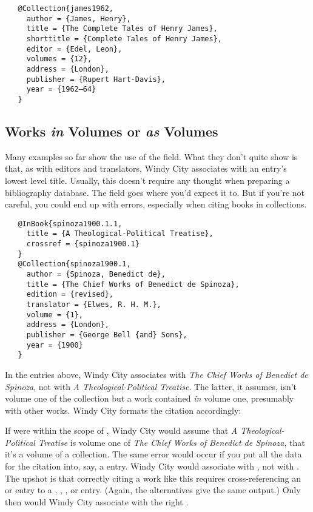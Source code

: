 \documentclass[11pt,letterpaper,oneside]{article}
\begin{document}
\begin{verbatim}
   @Collection{james1962,
     author = {James, Henry},
     title = {The Complete Tales of Henry James},
     shorttitle = {Complete Tales of Henry James},
     editor = {Edel, Leon},
     volumes = {12},
     address = {London},
     publisher = {Rupert Hart-Davis},
     year = {1962–64}
   }
\end{verbatim}

\subsection{Works \textit{in} Volumes or \textit{as} Volumes}

Many examples so far show the use of the  field. What
they don't quite show is that, as with editors and translators, Windy
City associates  with an entry's lowest level title.
Usually, this doesn't require any thought when preparing a
bibliography database. The  field goes where you'd
expect it to. But if you're not careful, you could end up with errors,
especially when citing books in collections.

\begin{verbatim}
   @InBook{spinoza1900.1.1,
     title = {A Theological-Political Treatise},
     crossref = {spinoza1900.1}
   }
   @Collection{spinoza1900.1,
     author = {Spinoza, Benedict de},
     title = {The Chief Works of Benedict de Spinoza},
     edition = {revised},
     translator = {Elwes, R. H. M.},
     volume = {1},
     address = {London},
     publisher = {George Bell {and} Sons},
     year = {1900}
   }
\end{verbatim}

In the entries above, Windy City associates  with
\textit{The Chief Works of Benedict de Spinoza}, not with \textit{A
Theological-Political Treatise}. The latter, it assumes, isn't volume
one of the collection but a work contained \textit{in} volume one,
presumably with other works. Windy City formats the citation
accordingly:

\begin{citebib}
\item \cite{spinoza1900.1.1}
\end{citebib}

\noindent If  were within the scope of
, Windy City would assume that \textit{A
Theological-Political Treatise} is volume one of \textit{The Chief
Works of Benedict de Spinoza}, that it's a volume of a collection. The
same error would occur if you put all the data for the citation into,
say, a  entry. Windy City would associate
 with , not with
. The upshot is that correctly citing a work like
this requires cross-referencing an  or
 entry to a , ,
, or  entry. (Again, the
alternatives give the same output.) Only then would Windy City
associate  with the right .
\end{document}
